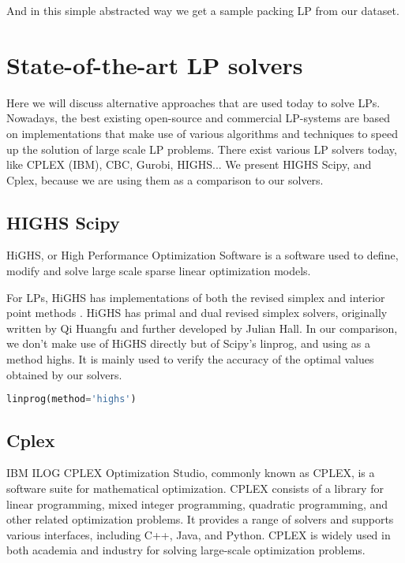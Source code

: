 And in this simple abstracted way we get a sample packing LP from our dataset.


\section{State-of-the-art LP solvers}
Here we will discuss alternative approaches that are used today to solve LPs. Nowadays, the best
existing open-source and commercial LP-systems are based on implementations that make use
of various algorithms and techniques to speed up the solution of large scale LP problems.
There exist various LP solvers today, like CPLEX (IBM), CBC, Gurobi, HIGHS... We present HIGHS Scipy, and 
Cplex, because we are using them as a comparison to our solvers.
\subsection{HIGHS Scipy}
HiGHS, or High Performance Optimization Software is a software used to define,
modify and solve large scale sparse linear optimization models.

For LPs, HiGHS has implementations of both the revised simplex and interior point methods 
\parencite{Huangfu2018}. 
HiGHS has primal and
 dual revised simplex solvers, originally written by Qi Huangfu and 
 further developed by Julian Hall. 
In our comparison, we don't make use of HiGHS directly but of Scipy's linprog, and using as 
a method highs. It is mainly used to verify the accuracy of the optimal values 
obtained by our solvers.

\begin{lstlisting}[language=Python]
    linprog(method='highs')
\end{lstlisting}

\subsection{Cplex}
IBM ILOG CPLEX Optimization Studio, commonly known as CPLEX,
 is a software suite for mathematical optimization.
  CPLEX consists of a library for linear programming, 
  mixed integer programming, quadratic programming, and other related optimization problems.
   It provides a range of solvers and supports various interfaces, including C++, Java, and Python.
    CPLEX is widely used in both academia and industry for solving large-scale optimization 
    problems. 
